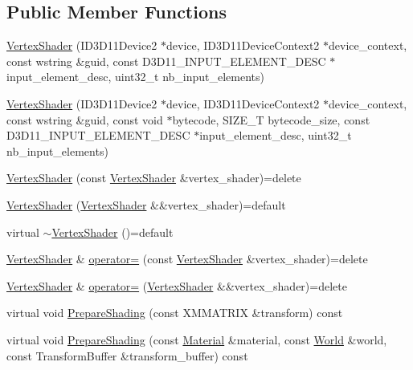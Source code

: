 \subsection*{Public Member Functions}
\begin{DoxyCompactItemize}
\item 
\hyperlink{classmage_1_1_vertex_shader_a0add7dbd710d444fbd5f7c9dc05e2dbb}{Vertex\+Shader} (I\+D3\+D11\+Device2 $\ast$device, I\+D3\+D11\+Device\+Context2 $\ast$device\+\_\+context, const wstring \&guid, const D3\+D11\+\_\+\+I\+N\+P\+U\+T\+\_\+\+E\+L\+E\+M\+E\+N\+T\+\_\+\+D\+E\+SC $\ast$input\+\_\+element\+\_\+desc, uint32\+\_\+t nb\+\_\+input\+\_\+elements)
\item 
\hyperlink{classmage_1_1_vertex_shader_a6084c9d362a18e9676194acb8b454030}{Vertex\+Shader} (I\+D3\+D11\+Device2 $\ast$device, I\+D3\+D11\+Device\+Context2 $\ast$device\+\_\+context, const wstring \&guid, const void $\ast$bytecode, S\+I\+Z\+E\+\_\+T bytecode\+\_\+size, const D3\+D11\+\_\+\+I\+N\+P\+U\+T\+\_\+\+E\+L\+E\+M\+E\+N\+T\+\_\+\+D\+E\+SC $\ast$input\+\_\+element\+\_\+desc, uint32\+\_\+t nb\+\_\+input\+\_\+elements)
\item 
\hyperlink{classmage_1_1_vertex_shader_a713f8581278ea2e5eb3010207b7e42a8}{Vertex\+Shader} (const \hyperlink{classmage_1_1_vertex_shader}{Vertex\+Shader} \&vertex\+\_\+shader)=delete
\item 
\hyperlink{classmage_1_1_vertex_shader_a07437a9371fa85f2e24e6713f6192d63}{Vertex\+Shader} (\hyperlink{classmage_1_1_vertex_shader}{Vertex\+Shader} \&\&vertex\+\_\+shader)=default
\item 
virtual \hyperlink{classmage_1_1_vertex_shader_a83e5bd464361b7f94f969475f1eeaf2a}{$\sim$\+Vertex\+Shader} ()=default
\item 
\hyperlink{classmage_1_1_vertex_shader}{Vertex\+Shader} \& \hyperlink{classmage_1_1_vertex_shader_a0094f5c2adb8377fa5c8d52e7a65136f}{operator=} (const \hyperlink{classmage_1_1_vertex_shader}{Vertex\+Shader} \&vertex\+\_\+shader)=delete
\item 
\hyperlink{classmage_1_1_vertex_shader}{Vertex\+Shader} \& \hyperlink{classmage_1_1_vertex_shader_ada6250a89610e5649e0062c9a50fb78a}{operator=} (\hyperlink{classmage_1_1_vertex_shader}{Vertex\+Shader} \&\&vertex\+\_\+shader)=delete
\item 
virtual void \hyperlink{classmage_1_1_vertex_shader_a928e013248cf9c7cf17923bd6ff6a3e6}{Prepare\+Shading} (const X\+M\+M\+A\+T\+R\+IX \&transform) const
\item 
virtual void \hyperlink{classmage_1_1_vertex_shader_a15a8b2c1a1a4c8fde3ff903c999ec218}{Prepare\+Shading} (const \hyperlink{structmage_1_1_material}{Material} \&material, const \hyperlink{classmage_1_1_world}{World} \&world, const Transform\+Buffer \&transform\+\_\+buffer) const
\end{DoxyCompactItemize}
